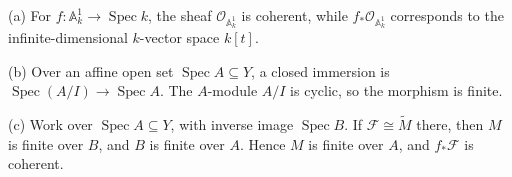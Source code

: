 (a) For $f:\mathbb A_k^1\to\operatorname{Spec}k$, the sheaf $\mathcal O_{\mathbb A_k^1}$ is coherent, while $f_*\mathcal O_{\mathbb A_k^1}$ corresponds to the infinite-dimensional $k$-vector space $k[t]$.

(b) Over an affine open set $\operatorname{Spec}A\subseteq Y$, a closed immersion is $\operatorname{Spec}(A/I)\to\operatorname{Spec}A$. The $A$-module $A/I$ is cyclic, so the morphism is finite.

(c) Work over $\operatorname{Spec}A\subseteq Y$, with inverse image $\operatorname{Spec}B$. If $\mathcal F\cong\widetilde M$ there, then $M$ is finite over $B$, and $B$ is finite over $A$. Hence $M$ is finite over $A$, and $f_*\mathcal F$ is coherent.
